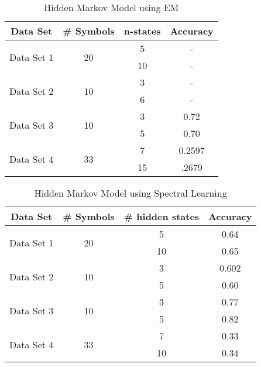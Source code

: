 \documentclass{article} %
\begin{document}
\begin{table}[H]
\caption{Hidden Markov Model using EM}
\label{HMM_EM}
\begin{center}
\begin{tabular}{ |c|c|c|c| }
\hline
\multicolumn{1}{|c|}{\bf Data Set} &\multicolumn{1}{|c|}{\bf\# Symbols} &\multicolumn{1}{|c|}{\bf n-states} &\multicolumn{1}{|c|}{\bf Accuracy}\\
\hline
\multirow{2}{*}{Data Set 1}& \multirow{2}{*}{20} & 5 & - \\
& & 10 & - \\
\hline
\multirow{2}{*}{Data Set 2}& \multirow{2}{*}{10} & 3 & - \\
& & 6 & - \\
\hline
\multirow{2}{*}{Data Set 3}& \multirow{2}{*}{10} & 3 & 0.72 \\
& & 5 & 0.70 \\
\hline
\multirow{2}{*}{Data Set 4}& \multirow{2}{*}{33} & 7 & 0.2597 \\
& & 15 & .2679 \\
\hline
\end{tabular}
\end{center}
\end{table}

\begin{table}[H]
\caption{Hidden Markov Model using Spectral Learning}
\label{Spectral Learning}
\begin{center}
\begin{tabular}{ |c|c|c|c| }
\hline
\multicolumn{1}{|c|}{\bf Data Set} &\multicolumn{1}{|c|}{\bf \# Symbols} &\multicolumn{1}{|c|}{\bf \# hidden states} &\multicolumn{1}{|c|}{\bf Accuracy}\\
\hline
\multirow{2}{*}{Data Set 1}& \multirow{2}{*}{20} & 5 & 0.64 \\
& & 10 & 0.65 \\
\hline
\multirow{2}{*}{Data Set 2}& \multirow{2}{*}{10} & 3 & 0.602 \\
& & 5 & 0.60 \\
\hline
\multirow{2}{*}{Data Set 3}& \multirow{2}{*}{10} & 3 & 0.77 \\
& & 5 & 0.82 \\
\hline
\multirow{2}{*}{Data Set 4}& \multirow{2}{*}{33} & 7 & 0.33 \\
& & 10 & 0.34 \\
\hline
\end{tabular}
\end{center}
\end{table}
\end{document}
